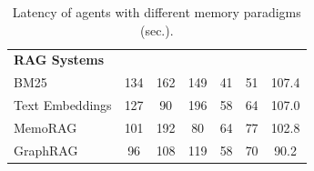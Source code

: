 \begin{table}[h]
{\begin{tabular}{@{}lcccccc@{}}
\rowcolor[HTML]{EFEFEF} 
\textbf{RAG Systems}    &     &     &     &    &    &       \\
BM25                    & 134 & 162 & 149 & 41 & 51 & 107.4 \\
Text Embeddings         & 127 & 90  & 196 & 58 & 64 & 107.0 \\
MemoRAG                 & 101 & 192 & 80  & 64 & 77 & 102.8 \\
GraphRAG                & 96  & 108 & 119 & 58 & 70 & 90.2  \\ \bottomrule
\end{tabular}%
}
\caption{Latency of agents with different memory paradigms (sec.). }
\label{tab:latency}
\vspace{-20pt}
\end{table}

